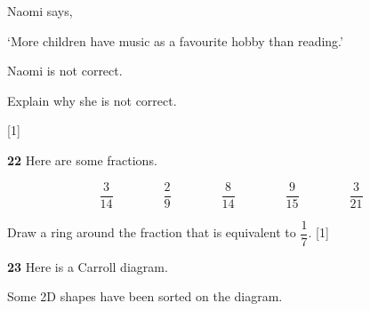 \documentclass[12pt]{article}
\newcommand{\QuestionMarks}[1]{\hfill [#1]}
\newcommand{\AnswerLine}[1]{\makebox[#1]{\hrulefill}}
\begin{document}
	\vspace{0.25cm}
	
	Naomi says,
	
	\vspace{0.25cm}
	
	\hspace*{1.5cm}`More children have music as a favourite hobby than reading.'
	
	\vspace{0.35cm}
	
	Naomi is not correct.
	
	\vspace{0.25cm}
	
	Explain why she is not correct.
	
	\vspace{0.3cm}
	
	\AnswerLine{16cm}
	
	\vspace{0.25cm}
	
	\AnswerLine{16cm}
	
	\vspace{0.25cm}
	
	\AnswerLine{16cm} \QuestionMarks{1}
	
	\vspace{0.8cm}
	
	\textbf{22}\quad
	Here are some fractions.
	
	\vspace{0.4cm}
	
	\[
	\frac{3}{14}
	\qquad\qquad
	\frac{2}{9}
	\qquad\qquad
	\frac{8}{14}
	\qquad\qquad
	\frac{9}{15}
	\qquad\qquad
	\frac{3}{21}
	\]
	
	\vspace{0.35cm}
	
	Draw a ring around the fraction that is equivalent to \(\dfrac{1}{7}\). \QuestionMarks{1}
	
	\vspace{0.8cm}
	
	\textbf{23}\quad
	Here is a Carroll diagram.
	
	\vspace{0.25cm}
	
	Some 2D shapes have been sorted on the diagram.
	
	\vspace{0.3cm}
	
\end{document}
